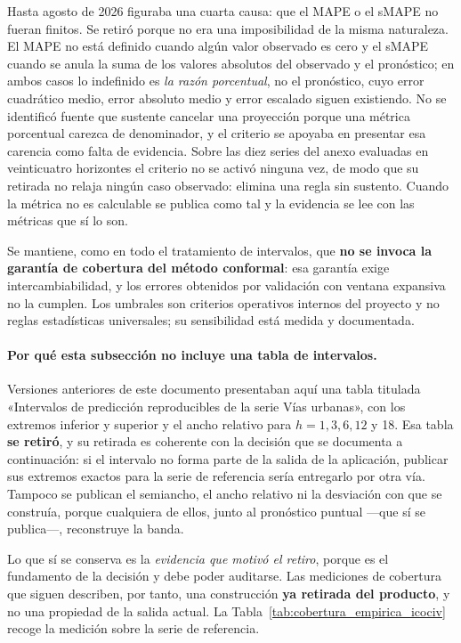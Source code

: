 \documentclass[12pt,letterpaper]{article}
\begin{document}
Hasta agosto de 2026 figuraba una cuarta causa: que el MAPE o el sMAPE no fueran finitos. Se retiró porque no era una imposibilidad de la misma naturaleza. El MAPE no está definido cuando algún valor observado es cero y el sMAPE cuando se anula la suma de los valores absolutos del observado y el pronóstico; en ambos casos lo indefinido es \emph{la razón porcentual}, no el pronóstico, cuyo error cuadrático medio, error absoluto medio y error escalado siguen existiendo. No se identificó fuente que sustente cancelar una proyección porque una métrica porcentual carezca de denominador, y el criterio se apoyaba en presentar esa carencia como falta de evidencia. Sobre las diez series del anexo evaluadas en veinticuatro horizontes el criterio no se activó ninguna vez, de modo que su retirada no relaja ningún caso observado: elimina una regla sin sustento. Cuando la métrica no es calculable se publica como tal y la evidencia se lee con las métricas que sí lo son.

Se mantiene, como en todo el tratamiento de intervalos, que \textbf{no se invoca la garantía de cobertura del método conformal}: esa garantía exige intercambiabilidad, y los errores obtenidos por validación con ventana expansiva no la cumplen. Los umbrales son criterios operativos internos del proyecto y no reglas estadísticas universales; su sensibilidad está medida y documentada.

\paragraph{Por qué esta subsección no incluye una tabla de intervalos.} Versiones anteriores de este documento presentaban aquí una tabla titulada «Intervalos de predicción reproducibles de la serie Vías urbanas», con los extremos inferior y superior y el ancho relativo para \(h = 1, 3, 6, 12\) y 18. Esa tabla \textbf{se retiró}, y su retirada es coherente con la decisión que se documenta a continuación: si el intervalo no forma parte de la salida de la aplicación, publicar sus extremos exactos para la serie de referencia sería entregarlo por otra vía. Tampoco se publican el semiancho, el ancho relativo ni la desviación con que se construía, porque cualquiera de ellos, junto al pronóstico puntual ---que sí se publica---, reconstruye la banda.

Lo que sí se conserva es la \emph{evidencia que motivó el retiro}, porque es el fundamento de la decisión y debe poder auditarse. Las mediciones de cobertura que siguen describen, por tanto, una construcción \textbf{ya retirada del producto}, y no una propiedad de la salida actual. La Tabla~\ref{tab:cobertura_empirica_icociv} recoge la medición sobre la serie de referencia.
\end{document}
